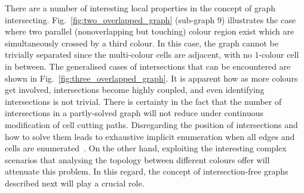 \documentclass[conference]{IEEEtran}
\begin{document}
There are a number of interesting local properties in the concept of graph intersecting. 
Fig.~\ref{fig:two_overlapped_graph} (sub-graph $9$) illustrates the case where two parallel (nonoverlapping but touching) colour region exist which are simultaneously crossed by a third colour. In this case, the graph cannot be trivially separated since the multi-colour cells are adjacent, with no $1$-colour cell in between. The generalised cases of intersections that can be encountered are shown in Fig.~\ref{fig:three_overlapped_graph}. 
It is apparent how as more colours get involved, %
intersections become highly coupled, and even identifying intersections is not trivial. 
There is certainty in the fact that the number of intersections in a partly-solved graph will not reduce under continuous modification of cell cutting paths. 
Disregarding the position of intersections and how to solve them leads to exhaustive implicit enumeration when all edges and cells are enumerated~\cite{Yang2020Cellular}. 
On the other hand, exploiting the interesting complex scenarios that analysing the topology between different colours offer will attenuate this problem. In this regard, the concept of intersection-free graphs described next will play a crucial role.  
\end{document}
